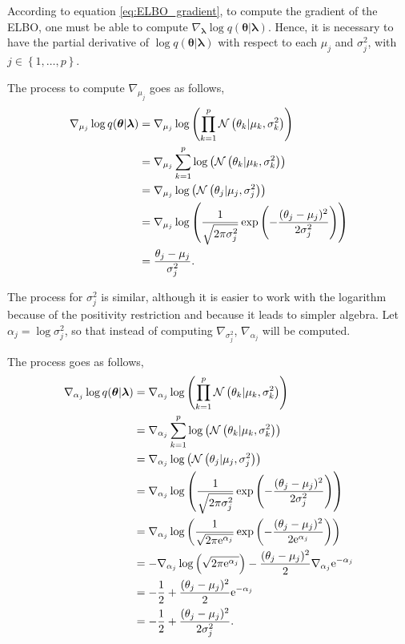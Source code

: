 According to equation \eqref{eq:ELBO_gradient}, to compute the gradient of the ELBO, one must be able to compute $\nabla_{\boldsymbol{\lambda}} \log q(\boldsymbol{\theta} | \boldsymbol{\lambda})$. Hence, it is necessary to have the partial derivative of $\log q(\boldsymbol{\theta} | \boldsymbol{\lambda})$ with respect to each $\mu_j$ and $\sigma_j^2$, with $j \in \left\{ 1, \hdots, p \right\}$.

The process to compute $\nabla_{\mu_j}$ goes as follows,
\begin{equation}
  \begin{split}
      \nabla_{\mu_j} \log q(\boldsymbol{\theta} | \boldsymbol{\lambda}) & =
      \nabla_{\mu_j} \log \left( \prod_{ k = 1}^p \mathcal{N}\left( \theta_k | \mu_k, \sigma_k^2 \right) \right) \\
      &= \nabla_{\mu_j} \sum_{ k = 1}^p \log \left( \mathcal{N}\left( \theta_k | \mu_k, \sigma_k^2 \right) \right) \\
      &= \nabla_{\mu_j} \log \left( \mathcal{N}\left( \theta_j | \mu_j, \sigma_j^2 \right) \right) \\
      &= \nabla_{\mu_j} \log \left( \frac{1}{\sqrt{2 \pi \sigma_j^2}} \exp \left( -\frac{(\theta_j - \mu_j)^2}{2 \sigma_j^2} \right) \right) \\
      &= \frac{\theta_j - \mu_j}{\sigma_j^2}.
  \end{split}
\end{equation}

The process for $\sigma_j^2$ is similar, although it is easier to work with the logarithm because of the positivity restriction and because it leads to simpler algebra. Let $\alpha_j = \log \sigma_j^2$, so that instead of computing $\nabla_{\sigma_j^2}$, $\nabla_{\alpha_j}$ will be computed.

The process goes as follows,
\begin{equation}
  \begin{split}
      \nabla_{\alpha_j} \log q(\boldsymbol{\theta} | \boldsymbol{\lambda}) & =
      \nabla_{\alpha_j} \log \left( \prod_{ k = 1}^p \mathcal{N}\left( \theta_k | \mu_k, \sigma_k^2 \right) \right) \\
      &= \nabla_{\alpha_j} \sum_{ k = 1}^p \log \left( \mathcal{N}\left( \theta_k | \mu_k, \sigma_k^2 \right) \right) \\
      &= \nabla_{\alpha_j} \log \left( \mathcal{N}\left( \theta_j | \mu_j, \sigma_j^2 \right) \right) \\
      &= \nabla_{\alpha_j} \log \left( \frac{1}{\sqrt{2 \pi \sigma_j^2}} \exp \left( -\frac{(\theta_j - \mu_j)^2}{2 \sigma_j^2} \right) \right) \\
      &= \nabla_{\alpha_j} \log \left( \frac{1}{\sqrt{2 \pi \mathrm{e}^{\alpha_j}}} \exp \left( -\frac{(\theta_j - \mu_j)^2}{2 \mathrm{e}^{\alpha_j}} \right) \right) \\
      &= - \nabla_{\alpha_j} \log \left( \sqrt{2 \pi \mathrm{e}^{\alpha_j}} \right) - \frac{(\theta_j - \mu_j)^2}{2} \nabla_{\alpha_j} \mathrm{e}^{-\alpha_j}\\
      &= - \frac{1}{2} + \frac{(\theta_j - \mu_j)^2}{2} \mathrm{e}^{-\alpha_j} \\
      &= - \frac{1}{2} + \frac{(\theta_j - \mu_j)^2}{2 \sigma_j^2}.
  \end{split}
\end{equation}

